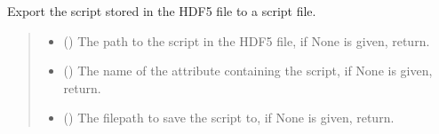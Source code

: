 \documentclass[letterpaper,10pt,english]{sphinxmanual}
\begin{document}
\begin{fulllineitems}
\begin{fulllineitems}
\begin{quote}
\begin{description}
\begin{itemize}
\end{itemize}

\end{description}\end{quote}

\end{fulllineitems}


\begin{fulllineitems}
\label{\detokenize{source/_autosummary/HDF5_BLS.Wrapper:HDF5_BLS.Wrapper.save_stored_script}}
\pysigstartsignatures
\pysiglinewithargsret
{}
{\sphinxparamcomma {}\sphinxparamcomma {}}
{}
\pysigstopsignatures
\sphinxAtStartPar
Export the script stored in the HDF5 file to a script file.
\begin{quote}\begin{description}
\begin{itemize}
\item {} 
\sphinxAtStartPar
{} (\sphinxstyleliteralemphasis{\sphinxupquote{, }}) \textendash{} The path to the script in the HDF5 file, if None is given, return.

\item {} 
\sphinxAtStartPar
{} (\sphinxstyleliteralemphasis{\sphinxupquote{, }}) \textendash{} The name of the attribute containing the script, if None is given, return.

\item {} 
\sphinxAtStartPar
{} (\sphinxstyleliteralemphasis{\sphinxupquote{, }}) \textendash{} The filepath to save the script to, if None is given, return.


\end{itemize}
\end{description}
\end{quote}
\end{fulllineitems}
\end{fulllineitems}
\end{document}
